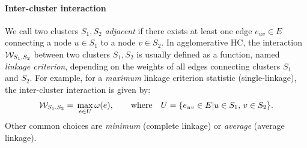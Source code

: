 \paragraph{Inter-cluster interaction}\label{par:linkage_criterion_def} We call two clusters $S_1,S_2$ \emph{adjacent} if there exists at least one edge ${e_{uv}\in E}$ connecting a node $u\in S_1$ to a node $v\in S_2$. In agglomerative HC, the interaction $\mathcal{W}_{S_1,S_2}$ between two clusters $S_1, S_2$ is usually defined as a function, named \emph{linkage criterion}, depending on the weights of all edges connecting clusters $S_1$ and $S_2$. For example, for a \emph{maximum} linkage criterion statistic (single-linkage), the inter-cluster interaction is given by:
\begin{equation}\label{eq:max_linkage}
\mathcal{W}_{S_1,S_2} = \, \max_{e\in U} \omega(e), \qquad \text{where}\quad U = \{ e_{uv} \in E | u \in S_1, \, v \in S_2 \}.
\end{equation}
Other common choices are \emph{minimum} (complete linkage) or \emph{average} (average linkage). %

